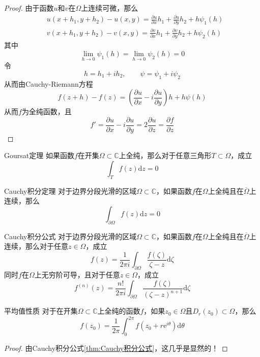 \documentclass[lang = cn, scheme = chinese, thmcnt = section]{elegantbook}
\newcommand{\C}{\mathbb{C}}  		   %
\newcommand{\sub}{\subset}             %
\newcommand{\dd}{\mathrm{d}}           %
\begin{document}
\begin{proof}
	由于函数$u$和$v$在$\Omega$​上连续可微，那么
	\begin{align*}
		& u(x+h_1,y+h_2)-u(x,y)=\frac{\partial u}{\partial x}h_1+\frac{\partial u}{\partial y}h_2+h\psi_1(h)\\
		& v(x+h_1,y+h_2)-v(x,y)=\frac{\partial v}{\partial x}h_1+\frac{\partial v}{\partial y}h_2+h\psi_2(h)
	\end{align*}
	其中%
	$$
	\lim_{h\to 0}\psi_1(h)=\lim_{h\to 0}\psi_2(h)=0
	$$
	令%
	$$
	h=h_1+ih_2,\qquad 
	\psi=\psi_1+i\psi_2
	$$
	从而由Cauchy-Riemann方程%
	$$
	f(z+h)-f(z)
	=\left(\frac{\partial u}{\partial x}-i\frac{\partial u}{\partial y}\right)h+h\psi(h)
	$$
	从而$f$为全纯函数，且%
	$$
	f'=\frac{\partial u}{\partial x}-i\frac{\partial u}{\partial y}=2\frac{\partial u}{\partial z}=\frac{\partial f}{\partial z}
	$$
\end{proof}

\begin{theorem}{Goursat定理}
	如果函数$f$在开集$\Omega\sub\C$上全纯，那么对于任意三角形$T\sub\Omega$，成立%
	$$
	\int_{T}f(z)\dd z=0
	$$
\end{theorem}

\begin{theorem}{Cauchy积分定理}
	对于边界分段光滑的区域$\Omega\sub\C$，如果函数$f$在$\Omega$上全纯且在$\overline{\Omega}$上连续，那么%
	$$
	\int_{\partial\Omega}f(z)\dd z=0
	$$
\end{theorem}

\begin{theorem}{Cauchy积分公式}
	对于边界分段光滑的区域$\Omega\sub\C$，如果函数$f$在$\Omega$上全纯且在$\overline{\Omega}$上连续，那么对于任意$z\in\Omega$，成立
	$$
	f(z)=\frac{1}{2\pi i}\int_{\partial \Omega}{\frac{f(\zeta)}{\zeta-z}\mathrm{d}\zeta}
	$$
	同时$f$在$\Omega$上无穷阶可导，且对于任意$z\in\Omega$，成立
	$$
	f^{(n)}(z)=\frac{n!}{2\pi i}\int_{\partial\Omega}{\frac{f(\zeta)}{(\zeta-z)^{n+1}}\mathrm{d}\zeta}
	$$
\end{theorem}

\begin{corollary}{平均值性质}
	对于在开集$\Omega\sub\C$上全纯的函数$f$，如果$z_0\in\Omega$且$D_r(z_0)\sub\Omega$，那么
	$$
	f(z_0)=\frac{1}{2\pi}\int_0^{2\pi}{f(z_0+r\mathrm{e}^{i\theta})\mathrm{d}\theta}
	$$
\end{corollary}

\begin{proof}
	由Cauchy积分公式\ref{thm:Cauchy积分公式}，这几乎是显然的！
\end{proof}
\end{document}
